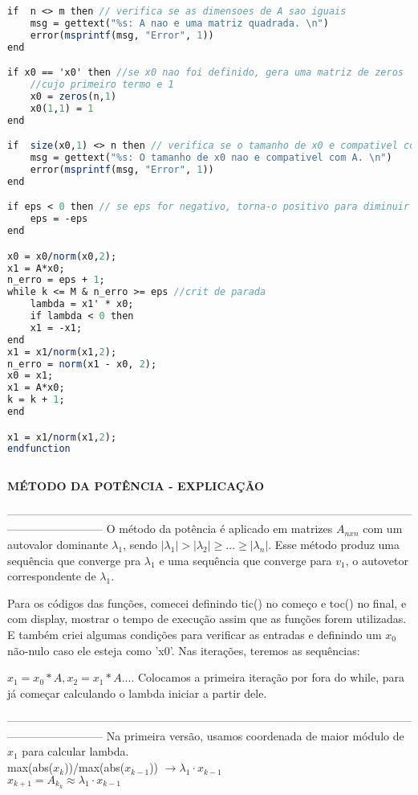 \documentclass[leqno]{article}
\numberwithin{equation}{section}
\begin{document}
\begin{enumerate}
\begin{sol}
\begin{lstlisting}[language=Scilab]
if  n <> m then // verifica se as dimensoes de A sao iguais
	msg = gettext("%s: A nao e uma matriz quadrada. \n")
	error(msprintf(msg, "Error", 1))
end

if x0 == 'x0' then //se x0 nao foi definido, gera uma matriz de zeros
	//cujo primeiro termo e 1
	x0 = zeros(n,1)
	x0(1,1) = 1
end

if  size(x0,1) <> n then // verifica se o tamanho de x0 e compativel com A
	msg = gettext("%s: O tamanho de x0 nao e compativel com A. \n")
	error(msprintf(msg, "Error", 1))
end

if eps < 0 then // se eps for negativo, torna-o positivo para diminuir iteracoes
	eps = -eps
end

x0 = x0/norm(x0,2);
x1 = A*x0;
n_erro = eps + 1;
while k <= M & n_erro >= eps //crit de parada
	lambda = x1' * x0;
	if lambda < 0 then
	x1 = -x1;
end
x1 = x1/norm(x1,2);
n_erro = norm(x1 - x0, 2);
x0 = x1;
x1 = A*x0;
k = k + 1;
end

x1 = x1/norm(x1,2);
endfunction
			
		\end{lstlisting}
	
	\textbf{{\large MÉTODO DA POTÊNCIA - EXPLICAÇÃO}}
	
	--------------------------------------------------------------------------------------------------------------------------------------	
	O método da potência é aplicado em matrizes $A_{nxn}$ com um autovalor dominante $\lambda_1$, sendo $|\lambda_1| > |\lambda_2| \geq ... \geq |\lambda_n|$. Esse método produz uma sequência que converge pra $\lambda_1$ e uma sequência que converge para $v_1$, o autovetor correspondente de $\lambda_1$.
	
	Para os códigos das funções, comecei definindo tic() no começo e toc() no final, e com display, mostrar o tempo de execução assim que as funções forem utilizadas. E também criei algumas condições para verificar as entradas e definindo um $x_0$ não-nulo caso ele esteja como 'x0'. Nas iterações, teremos as sequências:
	
	$x_1 = x_0 * A, x_2 = x_1 * A....$ Colocamos a primeira iteração por fora do while, para já começar calculando o lambda iniciar a partir dele.
	
	--------------------------------------------------------------------------------------------------------------------------------------
	Na primeira versão, usamos coordenada de maior módulo de $x_1$ para calcular lambda.\\
	max(abs($x_k$))/max(abs($x_{k-1}$)) $\rightarrow \lambda_1 \cdot x_{k-1}$\\
	$x_{k+1} = A_{k_k} \approx \lambda_1 \cdot x_{k-1}$
	

\end{sol}
\end{enumerate}
\end{document}
